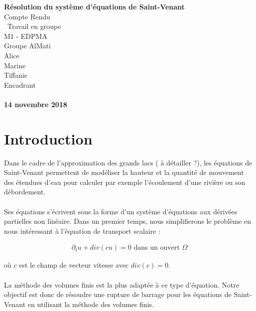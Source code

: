 \documentclass[12pt]{article}
\begin{document}
\begin{titlepage}
\begin{center}


\vspace{3cm}

\huge
\textbf{Résolution du système d'équations de Saint-Venant} \\
\vspace{0.7cm}
\Large
Compte Rendu\\
\ Travail en groupe \\
\large
\vspace{0.7cm}
M1 - EDPMA\\
Groupe AlMati\\
\vspace{0.7cm}
Alice  \\ Marine  \\ Tiffanie  \\
\vspace{0.7cm}
Encadrant\\
\\
\vspace{2cm}
\Large
\textbf{14 novembre 2018}
\end{center}
\end{titlepage}

\normalsize

\newpage
\tableofcontents
\newpage
\section{Introduction}

\noindent Dans le cadre de l'approximation des grands lacs ( à détailler ?), les équations de Saint-Venant permettent de modéliser la hauteur et la quantité de mouvement des étendues d'eau pour calculer par exemple l'écoulement d'une rivière ou son débordement. 
\\
\\Ses équations s'écrivent sous la forme d'un système d'équations aux dérivées partielles non linéaire. Dans un premier temps, nous simplifierons le problème en nous intéressant à l'équation de transport scalaire :

\begin{eqnarray}
    \partial_t u + div(cu) = 0 \text{ dans un ouvert } \Omega 
\end{eqnarray}

\noindent où $c$ est le champ de vecteur vitesse avec $div(c)=0$. 
\\
\\La méthode des volumes finis est la plus adaptée à ce type d'équation. Notre objectif est donc de résoudre une rupture de barrage pour les équations de Saint-Venant en utilisant la méthode des volumes finis.
\end{document}

